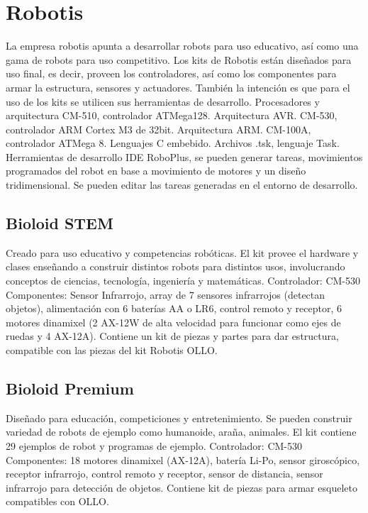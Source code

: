 
\section {Robotis}

La empresa robotis apunta a desarrollar robots para uso educativo, así como una gama de robots para uso competitivo. Los kits de Robotis están diseñados para uso final, es decir, proveen los controladores, así como los componentes para armar la estructura, sensores y actuadores. También la intención es que para el uso de los kits se utilicen sus herramientas de desarrollo.
Procesadores y arquitectura
  CM-510, controlador ATMega128. Arquitectura AVR.
  CM-530, controlador ARM Cortex M3 de 32bit. Arquitectura ARM.
  CM-100A, controlador ATMega 8.
Lenguajes
  C embebido. Archivos .tsk, lenguaje Task.
Herramientas de desarrollo
  IDE RoboPlus, se pueden generar tareas, movimientos programados del robot en base a movimiento de motores y un diseño tridimensional. Se pueden editar las tareas generadas en el entorno de desarrollo.


\subsection{Bioloid STEM}
Creado para uso educativo y competencias robóticas. El kit provee el hardware y clases enseñando a construir distintos robots para distintos usos, involucrando conceptos de ciencias, tecnología, ingeniería y matemáticas.
Controlador:
CM-530
Componentes:
Sensor Infrarrojo, array de 7 sensores infrarrojos (detectan objetos), alimentación con 6 baterías AA o LR6, control remoto y receptor, 6 motores dinamixel (2 AX-12W de alta velocidad para funcionar como ejes de ruedas y 4 AX-12A). Contiene un kit de piezas y partes para dar estructura, compatible con las piezas del kit Robotis OLLO.

\subsection{Bioloid Premium}
Diseñado para educación, competiciones y entretenimiento. Se pueden construir variedad de robots de ejemplo como humanoide, araña, animales. El kit contiene 29 ejemplos de robot y programas de ejemplo.
Controlador:
CM-530
Componentes:
18 motores dinamixel (AX-12A), batería Li-Po, sensor giroscópico, receptor infrarrojo, control remoto y receptor, sensor de distancia, sensor infrarrojo para detección de objetos. Contiene kit de piezas para armar esqueleto compatibles con OLLO.

